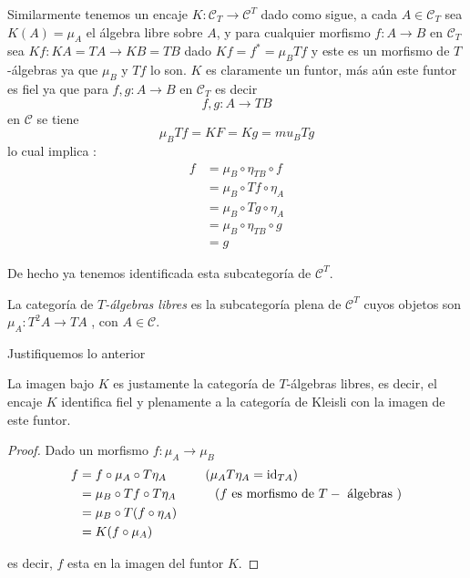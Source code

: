 \documentclass{comunicaciones}
\begin{document}
Similarmente tenemos un encaje $K\colon\mathcal{C}_{T}\rightarrow\mathcal{C}^{T}$ dado como sigue, a cada $A\in\mathcal{C}_{T}$ sea $K(A)=\mu_{A}$
el álgebra libre sobre $A$, y para cualquier morfismo $f\colon A\rightarrow B$ en $\mathcal{C}_{T}$ sea
$Kf\colon KA=TA\rightarrow KB=TB$ dado $Kf=f^{*}=\mu_{B}Tf$ y este es un morfismo de $T$-álgebras ya que $\mu_{B}$ y $Tf$ lo son.
$K$ es claramente un funtor, más aún este funtor es fiel ya que para $f,g\colon A\rightarrow B$ en $\mathcal{C}_{T}$ es decir \[f,g\colon A\rightarrow TB\] en $\mathcal{C}$ se tiene \[\mu_{B}Tf=KF=Kg=mu_{B}Tg\] lo cual implica
:
\[
    \begin{aligned}
       f
        &= \mu_{B}\circ\eta_{TB}\circ f \\
        &= \mu_{B}\circ Tf\circ \eta_{A}\\
        &= \mu_{B}\circ Tg\circ \eta_{A} \\
        &=\mu_{B}\circ \eta_{TB}\circ g\\
        &=g
        \end{aligned}\]

De hecho ya tenemos identificada esta subcategoría de $\mathcal{C}^{T}$.


\begin{dfn}\label{álgebras libres}
La categoría de $T$\emph{-álgebras libres} es la subcategoría plena de $\mathcal{C}^{T}$ cuyos objetos son $\mu_{A}\colon T^{2}A\rightarrow TA$ , con $A\in\mathcal{C}$.
\end{dfn}  

Justifiquemos lo anterior 

\begin{prop}\label{Kleisli is free}
La imagen bajo $K$ es justamente la categoría de $T$-álgebras libres, es decir, el encaje $K$ identifica fiel y plenamente a la categoría de Kleisli con la imagen de este funtor.
\end{prop}

\begin{proof}

    Dado un morfismo $f\colon \mu_{A}\rightarrow\mu_{B}$ 
    \[\begin{aligned}
        f
         &= f\circ\mu_{A}\circ T\eta_{A}\;\;\;\;\;\;\;\;\;\;\; (\mu_{A}T\eta_{A}={\rm id}_{TA})\\
         &= \mu_{B}\circ Tf\circ T\eta_{A}\;\;\;\;\;\;\;\;\;\;\; (f\text{ es morfismo de }T-\text{ álgebras })\\
         &= \mu_{B}\circ T(f\circ \eta_{A}) \\
         &=K(f\circ\mu_{A})\\
         \end{aligned}\]

         es decir, $f$ esta en la imagen del funtor $K$.
\end{proof}    
\end{document}
